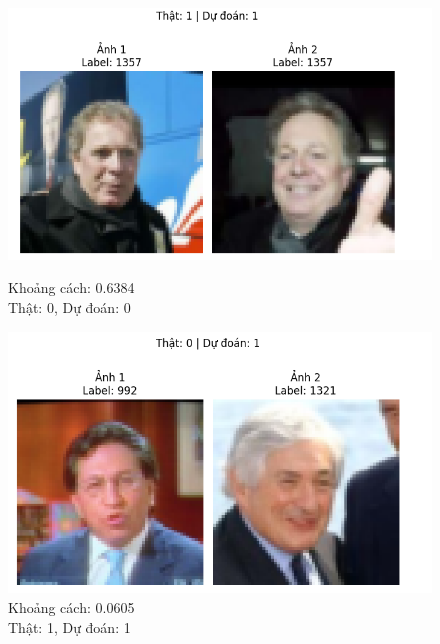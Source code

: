 {\begin{figure}[H]
    \centering
    \begin{minipage}[b]{0.48\textwidth}
        \centering
        \includegraphics[width=\linewidth]{img/05-1.png}
        \caption*{Khoảng cách: 0.6384\\Thật: 0, Dự đoán: 0}
    \end{minipage}
    \hfill
    \begin{minipage}[b]{0.48\textwidth}
        \centering
        \includegraphics[width=\linewidth]{img/05-2.png}
        \caption*{Khoảng cách: 0.0605\\Thật: 1, Dự đoán: 1}
    \end{minipage}
    
    \vspace{0.5cm}
    

\end{figure}}
